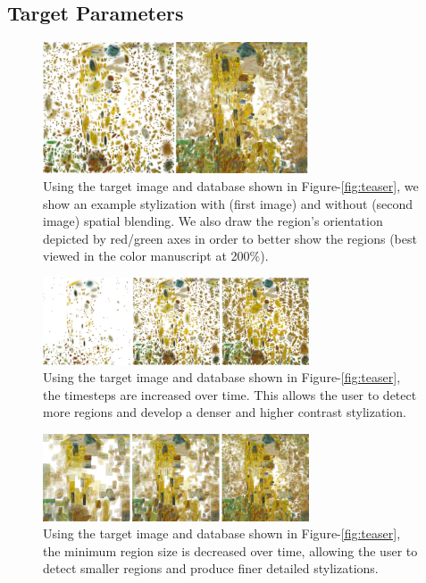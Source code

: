 \documentclass[a4paper,11pt,final]{ThesisStyle}
\begin{document}
\subsection{Target Parameters}\vspace{-0.4em}
\begin{figure}[ht]
  \centering
  \includegraphics[width=3.1in]{images/spatial-blending-3.png}
  
  \caption{Using the target image and database shown in Figure-\ref{fig:teaser}, we show an example stylization with (first image) and without (second image) spatial blending.  We also draw the region's orientation depicted by red/green axes in order to better show the regions (best viewed in the color manuscript at 200\%).}
  \label{fig:spatial-blending}
\end{figure}
\begin{figure}[ht]
  \centering
  \includegraphics[width=3.1in]{images/increasing-timesteps-2.png}
  
  \caption{Using the target image and database shown in Figure-\ref{fig:teaser}, the timesteps are increased over time.  This allows the user to detect more regions and develop a denser and higher contrast stylization.}
  \label{fig:timesteps}
\end{figure}
\begin{figure}[ht]
  \centering
  \includegraphics[width=3.1in]{images/decreasing-minimum-size-2.png}
  
  \caption{Using the target image and database shown in Figure-\ref{fig:teaser}, the minimum region size is decreased over time, allowing the user to detect smaller regions and produce finer detailed stylizations.}
  \label{fig:minimum-size}
\end{figure}
\end{document}
